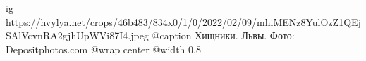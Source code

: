  
 
 
 
 

\ifcmt
  ig https://hvylya.net/crops/46b483/834x0/1/0/2022/02/09/mhiMENz8YulOzZ1QEjSAlVcvnRA2gjhUpWVi87I4.jpeg
  @caption Хищники. Львы. Фото: Depositphotos.com
  @wrap center
  @width 0.8
\fi
